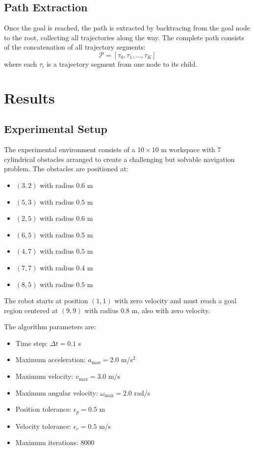 \documentclass[11pt]{article}
\begin{document}
\subsection{Path Extraction}

Once the goal is reached, the path is extracted by backtracing from the goal node to the root, collecting all trajectories along the way. The complete path consists of the concatenation of all trajectory segments:
\begin{equation}
\mathcal{P} = [\tau_0, \tau_1, \ldots, \tau_K]
\end{equation}
where each $\tau_i$ is a trajectory segment from one node to its child.

\section{Results}

\subsection{Experimental Setup}

The experimental environment consists of a $10 \times 10$ m workspace with 7 cylindrical obstacles arranged to create a challenging but solvable navigation problem. The obstacles are positioned at:
\begin{itemize}
    \item $(3, 2)$ with radius $0.6$ m
    \item $(5, 3)$ with radius $0.5$ m
    \item $(2, 5)$ with radius $0.6$ m
    \item $(6, 5)$ with radius $0.5$ m
    \item $(4, 7)$ with radius $0.5$ m
    \item $(7, 7)$ with radius $0.4$ m
    \item $(8, 5)$ with radius $0.5$ m
\end{itemize}

The robot starts at position $(1, 1)$ with zero velocity and must reach a goal region centered at $(9, 9)$ with radius $0.8$ m, also with zero velocity.

The algorithm parameters are:
\begin{itemize}
    \item Time step: $\Delta t = 0.1$ s
    \item Maximum acceleration: $a_{\max} = 2.0$ m/s$^2$
    \item Maximum velocity: $v_{\max} = 3.0$ m/s
    \item Maximum angular velocity: $\omega_{\max} = 2.0$ rad/s
    \item Position tolerance: $\epsilon_p = 0.5$ m
    \item Velocity tolerance: $\epsilon_v = 0.5$ m/s
    \item Maximum iterations: $8000$
\end{itemize}
\end{document}
